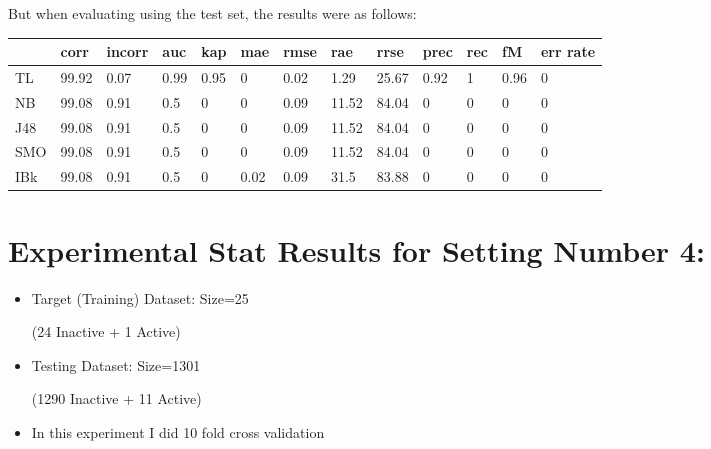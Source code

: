 \documentclass[a4paper,12pt, english]{article}
\begin{document}
But when evaluating using the test set, the results were as follows:
\begin{small}
\begin{center}
    \begin{tabular}{ | l | l | l | l | l | l | l | l | l | l | l | l | l |}
    \hline
      	& corr & incorr  & auc & kap & mae & rmse & rae & rrse & prec & rec & fM & err rate\\ \hline
      	TL & 99.92 & 0.07 & 0.99 & 0.95 & 0 & 0.02 & 1.29 & 25.67 & 0.92 & 1 & 0.96 & 0\\ \hline
	NB & 99.08 & 0.91 & 0.5 & 0 & 0 & 0.09 & 11.52 & 84.04 & 0 & 0 & 0 & 0\\ \hline
	J48 & 99.08 & 0.91 & 0.5 & 0 & 0 & 0.09 & 11.52 & 84.04 & 0 & 0 & 0 & 0\\ \hline
	SMO & 99.08 & 0.91 & 0.5 & 0 & 0 & 0.09 & 11.52 & 84.04 & 0 & 0 & 0 & 0\\ \hline
	IBk & 99.08 & 0.91 & 0.5 & 0 & 0.02 & 0.09 & 31.5 & 83.88 & 0 & 0 & 0 & 0\\ \hline  
    \end{tabular}       
\end{center}
\end{small}

\newpage

\section{Experimental Stat Results for Setting Number 4:}
\begin{itemize}
\item Target (Training) Dataset: Size=25 \begin{scriptsize}(24 Inactive + 1 Active)\end{scriptsize}
\item Testing Dataset: Size=1301 \begin{scriptsize}(1290 Inactive + 11 Active)\end{scriptsize}
\item In this experiment I did 10 fold cross validation
\end{itemize}  
\end{document}
